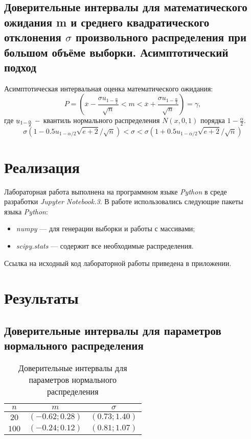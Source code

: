 \documentclass[12pt,a4paper]{article}
\begin{document}
	\subsection{Доверительные интервалы для математического ожидания m и среднего квадратического отклонения $\sigma$ произвольного распределения при большом объёме выборки. Асимптотический подход}
	
	Асимптотическая интервальная оценка математического ожидания:
	\begin{equation}
	P = \left(\overline{x}-\frac{\sigma u_{1-\frac{\alpha}{2}}}{\sqrt{n}}<m<\overline{x}+\frac{\sigma u_{1-\frac{\alpha}{2}}}{\sqrt{n}}\right)=\gamma,
	\end{equation}
	где $u_{1-\frac{\alpha}{2}}\;\--$ квантиль нормального распределения $N(x,0,1)$ порядка $1-\frac{\alpha}{2}$.
	\begin{equation}
	\sigma(1 - 0.5u_{1 - \alpha/2} \sqrt{e + 2}/ \sqrt{n}) < \sigma < \sigma(1 + 0.5u_{1 - \alpha/2} \sqrt{e + 2}/ \sqrt{n})
	\end{equation}
	
	\section{Реализация}
		Лабораторная работа выполнена на программном языке \emph{Python} в среде разработки \emph{Jupyter Notebook.3}. В работе использовались следующие пакеты языка \emph{Python}:
		\begin{itemize}
			\item \emph{numpy} --- для генерации выборки и работы с массивами;
			
			\item \emph{scipy.stats} --- содержит все необходимые распределения.
		\end{itemize}
		Ссылка на исходный код лабораторной работы приведена в приложении.

	\section{Результаты}
		\subsection{Доверительные интервалы для параметров нормального распределения}
		\begin{table}[H]
			\begin{center}
				\begin{tabular}{|c|c|c|}
					\hline
					$n$ & $m$ & $\sigma$\\
					\hline
					$20$ & $(-0.62; 0.28)$ & $(0.73; 1.40)$\\ 
					\hline
					$100$ & $(-0.24; 0.12)$ & $(0.81; 1.07)$\\
					\hline
				\end{tabular}
			\end{center}
			\caption{Доверительные интервалы для параметров нормального распределения}
		\end{table}
		
\end{document}
